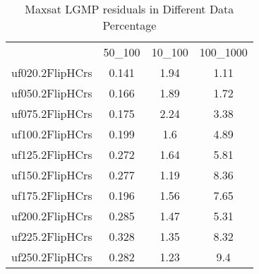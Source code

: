 \begin{table}[htbp]
\caption{Maxsat LGMP residuals in Different Data Percentage}
\centering
\begin{tabular}{|cccc|}
\hline
 & 50_100 & 10_100 & 100_1000 \\
uf020.2FlipHCrs & 0.141 & 1.94 & 1.11 \\
uf050.2FlipHCrs & 0.166 & 1.89 & 1.72 \\
uf075.2FlipHCrs & 0.175 & 2.24 & 3.38 \\
uf100.2FlipHCrs & 0.199 &  1.6 & 4.89 \\
uf125.2FlipHCrs & 0.272 & 1.64 & 5.81 \\
uf150.2FlipHCrs & 0.277 & 1.19 & 8.36 \\
uf175.2FlipHCrs & 0.196 & 1.56 & 7.65 \\
uf200.2FlipHCrs & 0.285 & 1.47 & 5.31 \\
uf225.2FlipHCrs & 0.328 & 1.35 & 8.32 \\
uf250.2FlipHCrs & 0.282 & 1.23 &  9.4 \\
\hline
\end{tabular}
\end{table}
